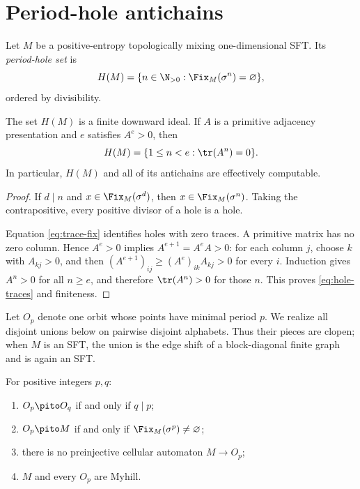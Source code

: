 \section{Period-hole antichains}
\label{sec:period-holes}

Let $M$ be a positive-entropy topologically mixing one-dimensional SFT.  Its
\emph{period-hole set} is
\begin{equation}
 H(M)=\{n\in\N_{>0}:\Fix_M(\sigma^n)=\varnothing\},
 \label{eq:hole-set}
\end{equation}
ordered by divisibility.

\begin{proposition}
\label{prop:hole-ideal}
The set $H(M)$ is a finite downward ideal.  If $A$ is a primitive adjacency
presentation and $e$ satisfies $A^e>0$, then
\begin{equation}
 H(M)=\{1\leq n<e:\tr(A^n)=0\}.
 \label{eq:hole-traces}
\end{equation}
In particular, $H(M)$ and all of its antichains are effectively computable.
\end{proposition}

\begin{proof}
If $d\mid n$ and $x\in\Fix_M(\sigma^d)$, then
$x\in\Fix_M(\sigma^n)$.  Taking the contrapositive, every positive divisor of
a hole is a hole.

Equation \eqref{eq:trace-fix} identifies holes with zero traces.  A primitive
matrix has no zero column.  Hence $A^e>0$ implies $A^{e+1}=A^eA>0$: for each
column $j$, choose $k$ with $A_{kj}>0$, and then
$(A^{e+1})_{ij}\geq(A^e)_{ik}A_{kj}>0$ for every $i$.  Induction gives
$A^n>0$ for all $n\geq e$, and therefore $\tr(A^n)>0$ for those $n$.  This
proves \eqref{eq:hole-traces} and finiteness.
\end{proof}

Let $O_p$ denote one orbit whose points have minimal period $p$.  We realize
all disjoint unions below on pairwise disjoint alphabets.  Thus their pieces
are clopen; when $M$ is an SFT, the union is the edge shift of a block-diagonal
finite graph and is again an SFT.



\begin{lemma}
\label{lem:periodic-routes}
For positive integers $p,q$:
\begin{enumerate}[label=(\roman*)]
  \item $O_p\pito O_q$ if and only if $q\mid p$;
  \item $O_p\pito M$ if and only if
  $\Fix_M(\sigma^p)\ne\varnothing$;
  \item there is no preinjective cellular automaton $M\to O_p$;
  \item $M$ and every $O_p$ are Myhill.
\end{enumerate}
\end{lemma}

